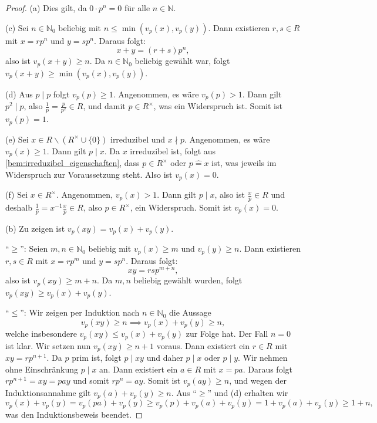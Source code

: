 \documentclass[a4paper, twoside, 11pt, ngerman]{report}
\newcommand{\NN}{\mathds N}
\renewcommand{\setminus}{\smallsetminus}
\newcommand{\assoc}{\mathrel{\widehat{=}}}
\theoremstyle{definistyle}
\theoremstyle{remark}
\begin{document}
\begin{proof}
(a) Dies gilt, da $0 \cdot p^n = 0$ für alle $n \in \NN$.

(c) Sei $n \in \NN_0$ beliebig mit $n \leq \min(v_p(x), v_p(y))$. Dann existieren $r, s \in R$ mit $x = r p^n$ und $y = s p^n$. Daraus folgt:
\[
x + y = (r + s) p^n,
\]
also ist $v_p(x + y) \geq n$.
Da $n \in \NN_0$ beliebig gewählt war, folgt $v_p(x + y) \geq \min(v_p(x), v_p(y))$. 

(d) Aus $p \mid p$ folgt $v_p(p) \geq 1$. 
Angenommen, es wäre $v_p(p) > 1$. Dann gilt $p^2 \mid p$, also $\frac{1}{p}=\frac{p}{p^2}\in R$,
und damit $p \in R^\times$, was ein Widerspruch ist. Somit ist $v_p(p) = 1$.

(e) Sei $x \in R \setminus (R^\times \cup \{0\})$ irreduzibel und $x \nmid p$.
Angenommen, es wäre $v_p(x) \geq 1$. Dann gilt $p \mid x$. Da $x$ irreduzibel ist, folgt aus \ref{bem:irreduzibel_eigenschaften}, dass $p \in R^\times$ oder $p \assoc x$ ist, was jeweils im Widerspruch zur Voraussetzung steht. Also ist $v_p(x) = 0$.

(f) Sei $x \in R^\times$.
Angenommen, $v_p(x) > 1$. Dann gilt $p \mid x$, also ist $\frac{x}{p}\in R$ und deshalb $\frac{1}{p} = x^{-1}\frac{x}{p}\in R$, also $p \in R^\times$, ein Widerspruch. Somit ist $v_p(x) = 0$.

(b) Zu zeigen ist $v_p(xy) = v_p(x) + v_p(y)$.

"`$\geq$"': Seien $m, n \in \NN_0$ beliebig mit $v_p(x) \geq m$ und $v_p(y) \geq n$. Dann existieren $r, s \in R$ mit $x = r p^m$ und $y = s p^n$. Daraus folgt:
\[
xy = r s p^{m+n},
\]
also ist $v_p(xy) \geq m + n$. Da $m, n$ beliebig gewählt wurden, folgt $v_p(xy) \geq v_p(x) + v_p(y)$.

"`$\leq$"': Wir zeigen per Induktion nach $n\in\NN_0$ die Aussage
\[v_p(xy) \geq n \implies v_p(x) + v_p(y) \geq n,\]
welche insbesondere $v_p(xy) \leq v_p(x) + v_p(y)$ zur Folge hat.
Der Fall $n=0$ ist klar. Wir setzen nun $v_p(xy) \geq n + 1$ voraus. 
Dann existiert ein $r \in R$ mit $xy = r p^{n+1}$. Da $p$ prim ist, folgt $p \mid xy$ und daher $p\mid x$ oder $p\mid y$. Wir nehmen ohne Einschränkung $p \mid x$ an. Dann existiert ein $a \in R$ mit $x = p a$. Daraus folgt $r p^{n+1} = xy = p a y$ und somit $r p^n = a y$.
Somit ist $v_p(a y) \geq n$, und wegen der Induktionsannahme gilt $v_p(a) + v_p(y) \geq n$. 
Aus "`$\geq$"' und (d) erhalten wir
\[
v_p(x) + v_p(y) = v_p(pa) + v_p(y)\geq v_p(p)+v_p(a)+v_p(y)=1+v_p(a)+v_p(y)\geq 1+n,
\]
was den Induktionsbeweis beendet.


\end{proof}
\end{document}
